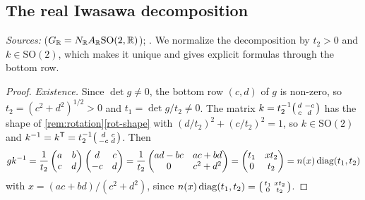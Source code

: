 \subsection*{The real Iwasawa decomposition}

\noindent\emph{Sources:} \cite[§5]{JL} ($G_{\mathbb{R}}=N_{\mathbb{R}} A_{\mathbb{R}}\mathrm{SO}(2,\mathbb{R})$); \cite[Prop.~4.1.1]{GH}. We normalize the
decomposition by $t_2>0$ and $k\in\mathrm{SO}(2)$, which makes it unique and gives explicit formulas through the bottom row.

\begin{theorem}
\end{theorem}
\begin{proof}
\emph{Existence.} Since $\det g\neq0$, the bottom row $(c,d)$ of $g$ is non-zero, so $t_2=(c^2+d^2)^{1/2}>0$ and $t_1=\det g/t_2\neq0$.
The matrix $k=t_2^{-1}\begin{psmallmatrix}d&-c\\c&d\end{psmallmatrix}$ has the shape of \cref{rem:rotation}\ref{rot-shape} with
$(d/t_2)^2+(c/t_2)^2=1$, so $k\in\mathrm{SO}(2)$ and $k^{-1}=k^{\mathsf T}=t_2^{-1}\begin{psmallmatrix}d&c\\-c&d\end{psmallmatrix}$. Then
\[
  gk^{-1}=\frac1{t_2}\begin{pmatrix}a&b\\c&d\end{pmatrix}\begin{pmatrix}d&c\\-c&d\end{pmatrix}
  =\frac1{t_2}\begin{pmatrix}ad-bc&ac+bd\\0&c^2+d^2\end{pmatrix}=\begin{pmatrix}t_1&xt_2\\0&t_2\end{pmatrix}
  =n(x)\operatorname{diag}(t_1,t_2)
\]
with $x=(ac+bd)/(c^2+d^2)$, since $n(x)\operatorname{diag}(t_1,t_2)=\begin{psmallmatrix}t_1&xt_2\\0&t_2\end{psmallmatrix}$.


\end{proof}
